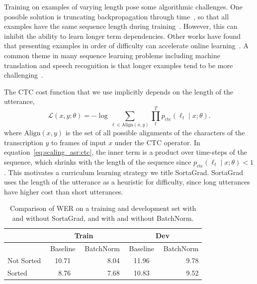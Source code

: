 Training on examples of varying length pose some algorithmic challenges. One
possible solution is truncating backpropagation through
time~\cite{williams1990}, so that all examples have the same sequence length
during training~\cite{sainath2015}. However, this can inhibit the ability to
learn longer term dependencies. Other works have found that presenting examples
in order of difficulty can accelerate online
learning~\cite{bengio2009curriculum, zaremba2014}. A common theme in many
sequence learning problems including machine translation and speech recognition
is that longer examples tend to be more challenging~\cite{cho2014}.

The CTC cost function that we use implicitly depends on the length of the
utterance,
\begin{equation}
\label{eq:scaling_asr:ctc}
    \mathcal{L}(x, y; \theta) = -\log \sum_{\ell \in \textrm{Align}(x, y)}
        \prod_t^{T} p_{\textrm{ctc}}(\ell_t \mid x; \theta).
\end{equation}
where $\textrm{Align}(x, y)$ is the set of all possible alignments of the
characters of the transcription $y$ to frames of input $x$ under the CTC
operator. In equation~\ref{eq:scaling_asr:ctc}, the inner term is a product
over time-steps of the sequence, which shrinks with the length of the sequence
since $p_{\textrm{ctc}}(\ell_t \mid x;\theta)<1$. This motivates a curriculum
learning strategy we title SortaGrad. SortaGrad uses the length of the
utterance as a heuristic for difficulty, since long utterances have higher cost
than short utterances.

\begin{table}
\centering
\begin{tabular}{l  r r r  r  r r r  r}
\toprule
& \multicolumn{4}{c}{Train} & \multicolumn{4}{c}{Dev}\\
\midrule
& \multicolumn{3}{c}{Baseline} &  BatchNorm & \multicolumn{3}{c}{Baseline} & BatchNorm\\
\midrule
Not Sorted & & 10.71 & & 8.04 & & 11.96 & & 9.78 \\
Sorted     & & 8.76 & & 7.68 & & 10.83 & & 9.52 \\
\bottomrule
\end{tabular}
\caption{Comparison of WER on a training and development set with and without
         SortaGrad, and with and without BatchNorm.}
\label{table:scaling_asr:sorting}
\end{table}

